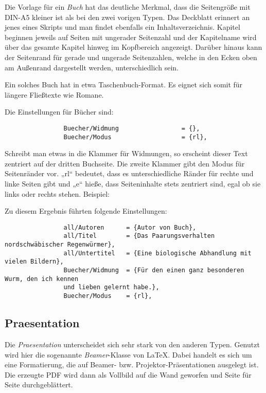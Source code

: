 				Die Vorlage für ein \emph{Buch} hat das deutliche Merkmal, dass die Seitengröße mit DIN-A5 kleiner ist als bei den zwei vorigen Typen. Das Deckblatt erinnert an jenes eines Skripts und man findet ebenfalls ein Inhaltsverzeichnis. Kapitel beginnen jeweils auf Seiten mit ungerader Seitenzahl und der Kapitelname wird über das gesamte Kapitel hinweg im Kopfbereich angezeigt. Darüber hinaus kann der Seitenrand für gerade und ungerade Seitenzahlen, welche in den Ecken oben am Außenrand dargestellt werden, unterschiedlich sein. 
				
				Ein solches Buch hat in etwa Taschenbuch-Format. Es eignet sich somit für längere Fließtexte wie \zb Romane. 
				
				Die Einstellungen für Bücher sind: 
				
				\begin{verbatim}
				Buecher/Widmung					= {},
				Buecher/Modus					= {rl},
				\end{verbatim}
				
				Schreibt man etwas in die Klammer für Widmungen, so erscheint dieser Text zentriert auf der dritten Buchseite. Die zweite Klammer gibt den Modus für Seitenränder vor. „rl“ bedeutet, dass es unterschiedliche Ränder für rechte und linke Seiten gibt und „e“ hieße, dass Seiteninhalte stets zentriert sind, egal ob sie links oder rechts stehen. Beispiel: 
				
				\begin{center}
				\end{center}
				
				Zu diesem Ergebnis führten folgende Einstellungen: 
				
				\begin{verbatim}
				all/Autoren      = {Autor von Buch},
				all/Titel        = {Das Paarungsverhalten nordschwäbischer Regenwürmer},
				all/Untertitel   = {Eine biologische Abhandlung mit vielen Bildern},
				Buecher/Widmung  = {Für den einen ganz besonderen Wurm, den ich kennen 
				und lieben gelernt habe.},
				Buecher/Modus    = {rl},
				\end{verbatim}
				
			\subsection{Praesentation}
			
				Die \emph{Praesentation} unterscheidet sich sehr stark von den anderen Typen. Genutzt wird hier die sogenannte \emph{Beamer}-Klasse von \LaTeX{}. Dabei handelt es sich um eine Formatierung, die auf Beamer- bzw. Projektor-Präsentationen ausgelegt ist. Die erzeugte PDF wird dann als Vollbild auf die Wand geworfen und Seite für Seite durchgeblättert. 
				
